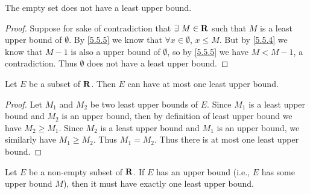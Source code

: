 \setcounter{theorem}{6}
\begin{example}\label{5.5.7}
  The empty set does not have a least upper bound.
\end{example}

\begin{proof}
  Suppose for sake of contradiction that \(\exists\ M \in \mathbf{R}\) such that \(M\) is a least upper bound of \(\emptyset\).
  By \cref{5.5.5} we know that \(\forall x \in \emptyset\), \(x \leq M\).
  But by \cref{5.5.4} we know that \(M - 1\) is also a upper bound of \(\emptyset\), so by \cref{5.5.5} we have \(M < M - 1\), a contradiction.
  Thus \(\emptyset\) does not have a least upper bound.
\end{proof}

\begin{proposition}\label{5.5.8}
  Let \(E\) be a subset of \(\mathbf{R}\).
  Then \(E\) can have at most one least upper bound.
\end{proposition}

\begin{proof}
  Let \(M_1\) and \(M_2\) be two least upper bounds of \(E\).
  Since \(M_1\) is a least upper bound and \(M_2\) is an upper bound, then by definition of least upper bound we have \(M_2 \geq M_1\).
  Since \(M_2\) is a least upper bound and \(M_1\) is an upper bound, we similarly have \(M_1 \geq M_2\).
  Thus \(M_1 = M_2\).
  Thus there is at most one least upper bound.
\end{proof}

\begin{theorem}\label{5.5.9}
  Let \(E\) be a non-empty subset of \(\mathbf{R}\).
  If \(E\) has an upper bound (i.e., \(E\) has some upper bound \(M\)), then it must have exactly one least upper bound.
\end{theorem}

